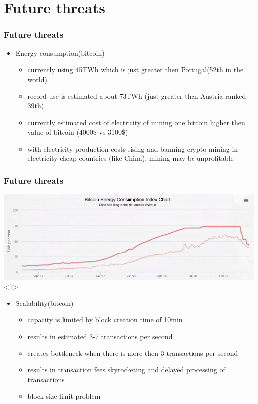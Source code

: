 \documentclass{beamer}
\begin{document}
\section{Future threats}
\begin{frame}
\frametitle{Future threats}
    \begin{itemize}
        \item<1-> Energy consumption(bitcoin)
        \begin{itemize}
            \item<2-> currently using 45TWh which is just greater then Portugal(52th in the world)
            \item<3-> record use is estimated about 73TWh (just greater then Austria ranked 39th)
            \item<4-> currently estimated cost of electricity of  mining one bitcoin higher then value of bitcoin (4000\$ vs 3100\$) 
            \item<5-> with electricity production costs rising and banning crypto mining in electricity-cheap countries (like China), mining may be unprofitable                    
        \end{itemize}
    \end{itemize}
\end{frame}
\begin{frame}
\frametitle{Future threats}
\includegraphics[width=\textwidth]{elec_chart.png}<1>
\begin{itemize}
    \item<2-> Scalability(bitcoin)
        \begin{itemize}
            \item<3-> capacity is limited by block creation time of 10min
            \item<4-> results in estimated 3-7 transactions per second
            \item<5-> creates bottleneck when there is more then 3 transactions per second
            \item<6-> results in transaction fees skyrocketing and delayed processing of transactions
            \item<7-> block size limit problem
        \end{itemize}
\end{itemize}
\end{frame}
\end{document}
